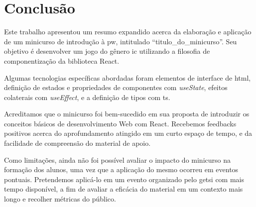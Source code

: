 \section{Conclusão}%
\label{sec:conclusao}

Este trabalho apresentou um resumo expandido acerca da elaboração e aplicação de um minicurso de introdução à \gls{pw}, intitulado ``\gls{titulo_do_minicurso}''.
Seu objetivo é desenvolver um jogo do gênero \gls{ic} utilizando a filosofia de componentização da biblioteca React.

Algumas tecnologias específicas abordadas foram elementos de interface de \gls{html}, definição de estados e propriedades de componentes com \textit{useState}, efeitos colaterais com \textit{useEffect}, e a definição de tipos com \gls{ts}.

Acreditamos que o minicurso foi bem-sucedido em sua proposta de introduzir os conceitos básicos de desenvolvimento Web com React.
Recebemos feedbacks positivos acerca do aprofundamento atingido em um curto espaço de tempo, e da facilidade de compreensão do material de apoio.

Como limitações, ainda não foi possível avaliar o impacto do minicurso na formação dos alunos, uma vez que a aplicação do mesmo ocorreu em eventos pontuais.
Pretendemos aplicá-lo em um evento organizado pelo \gls{getsi} com mais tempo disponível, a fim de avaliar a eficácia do material em um contexto mais longo e recolher métricas do público.

